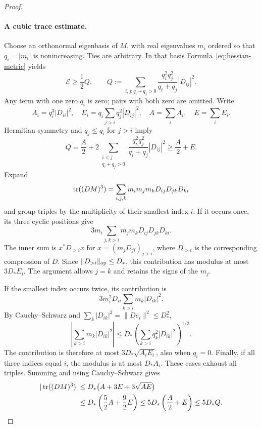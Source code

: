 \begin{proof}
\paragraph{A cubic trace estimate.}
Choose an orthonormal eigenbasis of $M$, with real eigenvalues $m_i$
ordered so that $q_i=|m_i|$ is nonincreasing.  Ties are arbitrary.
In that basis Formula~\eqref{eq:hessian-metric} yields
\begin{equation}\label{eq:trace-Q}
 \mathcal E\ge\frac12Q,\qquad
 Q:=\sum_{i,j:q_i+q_j>0}
 \frac{q_i^2q_j^2}{q_i+q_j}|D_{ij}|^2.
\end{equation}
Any term with one zero $q_i$ is zero; pairs with both zero are
omitted.  Write
\[
 A_i=q_i^3|D_{ii}|^2,\quad
 E_i=q_i\sum_{j>i}q_j^2|D_{ij}|^2,\quad
 A=\sum_iA_i,\quad E=\sum_iE_i.
\]
Hermitian symmetry and $q_j\le q_i$ for $j>i$ imply
\begin{equation}\label{eq:trace-AE}
 Q=\frac A2+
 2\sum_{\substack{i<j\\q_i+q_j>0}}
 \frac{q_i^2q_j^2}{q_i+q_j}|D_{ij}|^2
 \ge\frac A2+E.
\end{equation}
Expand
\[
 \operatorname{tr}((DM)^3)=\sum_{i,j,k}m_im_jm_kD_{ij}D_{jk}D_{ki}
\]
and group triples by the multiplicity of their smallest index $i$.
If it occurs once, its three cyclic positions give
\[
 3m_i\sum_{j,k>i}m_jm_kD_{ij}D_{jk}D_{ki}.
\]
The inner sum is $x^*D_{>i}x$ for
$x=(m_jD_{ji})_{j>i}$, where $D_{>i}$ is the corresponding
compression of $D$.  Since $\lVert D_{>i}\rVert_{\mathrm{op}}\le D_*$,
this contribution has modulus at most $3D_*E_i$.  The argument
allows $j=k$ and retains the signs of the $m_j$.

If the smallest index occurs twice, its contribution is
\[
 3m_i^2D_{ii}\sum_{k>i}m_k|D_{ik}|^2.
\]
By Cauchy--Schwarz and
$\sum_k|D_{ik}|^2=\lVert De_i\rVert^2\le D_*^2$,
\[
 \left|\sum_{k>i}m_k|D_{ik}|^2\right|
 \le D_*\left(\sum_{k>i}q_k^2|D_{ik}|^2\right)^{1/2}.
\]
The contribution is therefore at most $3D_*\sqrt{A_iE_i}$, also
when $q_i=0$.  Finally, if all three indices equal $i$, the modulus
is at most $D_*A_i$.  These cases exhaust all triples.  Summing and
using Cauchy--Schwarz gives
\begin{equation}\label{eq:trace-cubic}
 \begin{aligned}
 |\operatorname{tr}((DM)^3)|
 &\le D_*\bigl(A+3E+3\sqrt{AE}\bigr)\\
 &\le D_*\left(\frac52A+\frac92E\right)
 \le5D_*\left(\frac A2+E\right)
 \le5D_*Q.
 \end{aligned}
\end{equation}


\end{proof}
